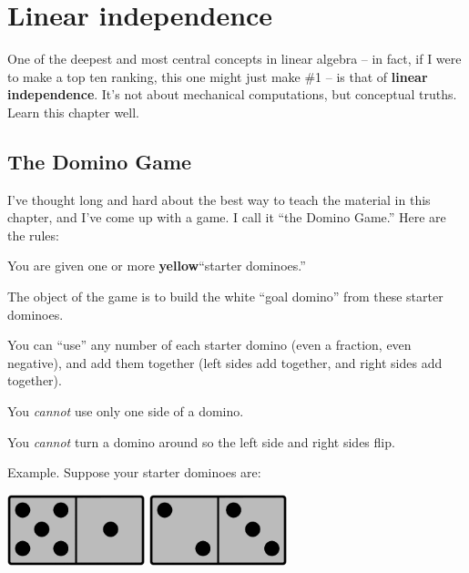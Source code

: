 
\chapter{Linear independence}


One of the deepest and most central concepts in linear algebra -- in fact, if I
were to make a top ten ranking, this one might just make \#1 -- is that of
\textbf{linear independence}. It's not about mechanical computations, but
conceptual truths. Learn this chapter well. 

\section{The Domino Game}

I've thought long and hard about the best way to teach the material in this
chapter, and I've come up with a game. I call it ``the Domino Game.'' Here are
the rules:

\begin{framed}
\begin{compactenum}
\item You are given one or more \textbf{yellow}\footnotemark ``starter dominoes.''
\item The object of the game is to build the white ``goal domino'' from these
starter dominoes.
\item You can ``use'' any number of each starter domino (even a fraction, even
negative), and add them together (left sides add together, and right sides add
together).
\item You \textit{cannot} use only one side of a domino.
\item You \textit{cannot} turn a domino around so the left side and right
sides flip.
\end{compactenum}
\end{framed}


Example. Suppose your starter dominoes are:

\begin{center}
\includegraphics[width=0.3\textwidth]{gray5_1.png}
\hspace{.3in}
\includegraphics[width=0.3\textwidth]{gray2_3.png}
\end{center}

